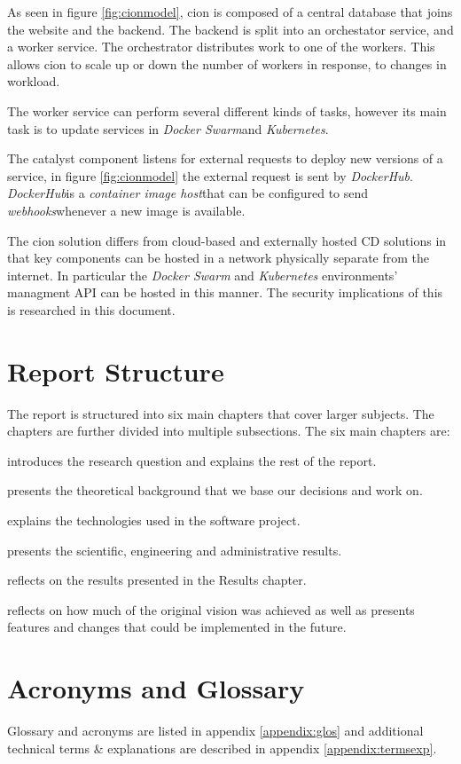 As seen in figure \ref{fig:cionmodel}, cion is composed of a central database that joins the website and the backend. The backend is split into an orchestator service, and a worker service. The orchestrator distributes work to one of the workers. This allows cion to scale up or down the number of workers in response, to changes in workload.

The worker service can perform several different kinds of tasks, however its main task is to update services in \textit{Docker Swarm}\footnotemark[1] and \textit{Kubernetes}\footnotemark[1]. 

The catalyst component listens for external requests to deploy new versions of a service, in figure \ref{fig:cionmodel} the external request is sent by \textit{DockerHub}\footnotemark[1]. \textit{DockerHub}\footnotemark[1] is a \textit{container image host}\footnotemark[1] that can be configured to send \textit{webhooks}\footnotemark[1] whenever a new image is available.


The cion solution differs from cloud-based and externally hosted \acrshort{CD} solutions in that key components can be hosted in a network physically separate from the internet. In particular the \textit{Docker Swarm} and \textit{Kubernetes} environments' managment \acrshort{API} can be hosted in this manner. The security implications of this is researched in this document.

\section{Report Structure}
\label{sec:reportstructure}
The report is structured into six main chapters that cover larger subjects. The chapters are further divided into multiple subsections. The six main chapters are:

\textbf{} introduces the research question and explains the rest of the report.

\textbf{} presents the theoretical background that we base our decisions and work on. 

\textbf{} explains the technologies used in the software project.

\textbf{} presents the scientific, engineering and administrative results.

\textbf{} reflects on the results presented in the Results chapter. 

\textbf{} reflects on how much of the original vision was achieved as well as presents features and changes that could be implemented in the future.

\section{Acronyms and Glossary}
Glossary and acronyms are listed in appendix \ref{appendix:glos} and additional technical terms \& explanations are described in appendix \ref{appendix:termsexp}.
